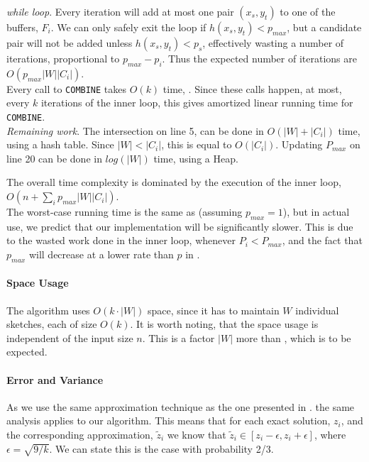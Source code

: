 \documentclass[a4paper,11pt]{article}
\begin{document}
\textit{while loop}. Every iteration will add at most one pair $(x_s, y_t)$ to one of the buffers, $F_i$. We can only safely exit the loop if $h(x_s, y_t) < p_{max}$, but a candidate pair will not be added unless $h(x_s, y_t) < p_s$, effectively wasting a number of iterations, proportional to $p_{max}-p_i$. Thus the expected number of iterations are $O(p_{max}|W||C_i|)$.\\ Every call to \texttt{COMBINE} takes $O(k)$ time, \cite{paper:amossen}. Since these calls happen, at most, every $k$ iterations of the inner loop, this gives amortized linear running time for \texttt{COMBINE}.\\


\textit{Remaining work}.
The intersection on line 5, can be done in $O(|W|+|C_i|)$ time, using a hash table. Since $|W|<|C_i|$, this is equal to $O(|C_i|)$.
Updating $P_{max}$ on line 20 can be done in $log(|W|)$ time, using a Heap.

The overall time complexity is dominated by the execution of the inner loop, $O(n + \sum_i p_{max}|W||C_i|)$.\\

The worst-case running time is the same as \cite{paper:amossen} (assuming $p_{max} = 1$), but in actual use, we predict that our implementation will be significantly slower. This is due to the wasted work done in the inner loop, whenever $P_i < P_{max}$, and the fact that $p_{max}$ will decrease at a lower rate than $p$ in \cite{paper:amossen}.

\paragraph{Space Usage}
The algorithm uses $O(k\cdot|W|)$ space, since it has to maintain $W$ individual sketches, each of size $O(k)$. It is worth noting, that the space usage is independent of the input size $n$. This is a factor $|W|$ more than \cite{paper:amossen}, which is to be expected.

\paragraph{Error and Variance}
As we use the same approximation technique as the one presented in \cite{paper:bar-yos}. the same analysis applies to our algorithm. This means that for each exact solution, $z_i$, and the corresponding approximation, $\tilde{z}_i$ we know that $\tilde{z}_i \in [z_i-\epsilon,z_i+\epsilon]$, where $\epsilon = \sqrt{9/k}$. We can state this is the case with probability 2/3.\\
\end{document}
